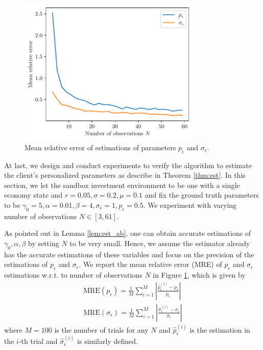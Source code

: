 \begin{figure}[t]
    \centering
    \includegraphics[width=87mm]{imgs/param_estimation.pdf}
    \caption{Mean relative error of estimations of parameters $p_\epsilon$ and $\sigma_\epsilon$.}
    \label{fig:param_estimation}
\end{figure}

At last, we design and conduct experiments to verify the algorithm to estimate the client's personalized parameters as describe in Theorem \ref{thm:est}. In this section, we let the sandbox investment environment to be one with a single economy state and $r=0.05,\sigma=0.2, \mu=0.1$ and fix the ground truth parameters to be $\gamma_0=5,\alpha=0.01,\beta=4,\sigma_\epsilon=1,p_\epsilon=0.5$. We experiment with varying number of observations $N\in[3,61]$. 

As pointed out in Lemma \ref{lem:est_ab}, one can obtain accurate estimations of $\gamma_0,\alpha,\beta$ by setting $N$ to be very small. Hence, we assume the estimator already has the accurate estimations of these variables and focus on the precision of the estimations of $p_\epsilon$ and $\sigma_\epsilon$. We report the mean relative error (MRE) of $p_\epsilon$ and $\sigma_\epsilon$ estimations w.r.t. to number of observations $N$ in Figure \ref{fig:param_estimation}, which is given by \begin{gather*}
    \text{MRE}(p_\epsilon)=\frac1M\sum_{i=1}^{M}\left|\frac{\hat p_\epsilon^{(i)} - p_\epsilon}{p_\epsilon}\right|\\
    \text{MRE}(\sigma_\epsilon)=\frac1M\sum_{i=1}^{M}\left|\frac{\hat \sigma_\epsilon^{(i)} - \sigma_\epsilon}{\sigma_\epsilon}\right|
\end{gather*} where $M=100$ is the number of trials for any $N$ and $\hat p_\epsilon^{(i)}$ is the estimation in the $i$-th trial and $\hat\sigma_\epsilon^{(i)}$ is similarly defined.

